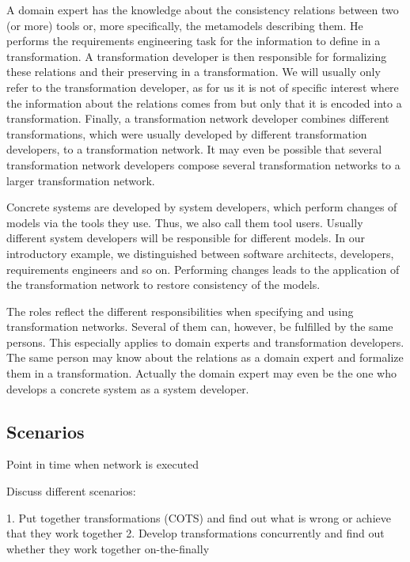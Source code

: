 A domain expert has the knowledge about the consistency relations between two (or more) tools or, more specifically, the metamodels describing them.
He performs the requirements engineering task for the information to define in a transformation.
A transformation developer is then responsible for formalizing these relations and their preserving in a transformation.
We will usually only refer to the transformation developer, as for us it is not of specific interest where the information about the relations comes from but only that it is encoded into a transformation.
Finally, a transformation network developer combines different transformations, which were usually developed by different transformation developers, to a transformation network.
It may even be possible that several transformation network developers compose several transformation networks to a larger transformation network.

Concrete systems are developed by system developers, which perform changes of models via the tools they use.
Thus, we also call them tool users.
Usually different system developers will be responsible for different models.
In our introductory example, we distinguished between software architects, developers, requirements engineers and so on.
Performing changes leads to the application of the transformation network to restore consistency of the models.

The roles reflect the different responsibilities when specifying and using transformation networks.
Several of them can, however, be fulfilled by the same persons.
This especially applies to domain experts and transformation developers.
The same person may know about the relations as a domain expert and formalize them in a transformation.
Actually the domain expert may even be the one who develops a concrete system as a system developer.



\subsection{Scenarios}

Point in time when network is executed

Discuss different scenarios: 

1. Put together transformations (COTS) and find out what is wrong or achieve that they work together
2. Develop transformations concurrently and find out whether they work together on-the-finally

